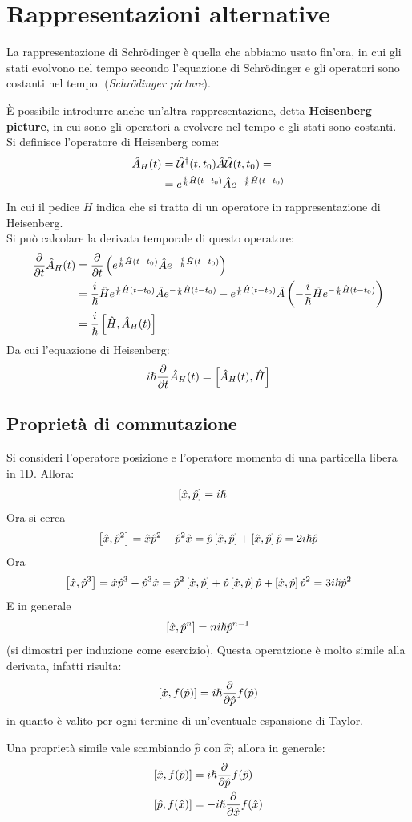 \newpage

\section{Rappresentazioni alternative}
La rappresentazione di Schrödinger è quella che abbiamo usato fin'ora, in cui gli stati evolvono nel tempo secondo l'equazione di Schrödinger e gli operatori sono costanti nel tempo. (\textit{Schrödinger picture}).

È possibile introdurre anche un'altra rappresentazione, detta \textbf{Heisenberg picture}, in cui sono gli operatori a evolvere nel tempo e gli stati sono costanti. \\
Si definisce l'operatore di Heisenberg come:
\begin{align*}
    \hat A_H(t) &= \U^\dag(t, t_0) \hat A \U(t, t_0) = \\
    &= e^{\frac{i}{\h} \hat H (t - t_0)} \hat A e^{-\frac{i}{\h} \hat H (t - t_0)}
\end{align*}
In cui il pedice $H$ indica che si tratta di un operatore in rappresentazione di Heisenberg. \\
Si può calcolare la derivata temporale di questo operatore:
\begin{align*}
    \deriv[t]{} \hat A_H(t) &= \deriv[t]{} \left( e^{\frac{i}{\h} \hat H (t - t_0)} \hat A e^{-\frac{i}{\h} \hat H (t - t_0)} \right) \\
    &= \frac{i}{\h} \hat H e^{\frac{i}{\h} \hat H (t - t_0)} \hat A e^{-\frac{i}{\h} \hat H (t - t_0)} - e^{\frac{i}{\h} \hat H (t - t_0)} \hat A \left( -\frac{i}{\h} \hat H e^{-\frac{i}{\h} \hat H (t - t_0)} \right) \\
    &= \frac{i}{\h} \comm{\hat H}{\hat A_H(t)}
\end{align*}
Da cui l'equazione di Heisenberg:
\[
    i \h \deriv[t]{} \hat A_H(t) = \comm{\hat A_H(t)}{\hat H}
\]

\subsection{Proprietà di commutazione}
Si consideri l'operatore posizione e l'operatore momento di una particella libera in 1D. Allora:
\begin{align*}
    \comm{\hat x}{\hat p} &= i \h
\end{align*}
Ora si cerca
\[
    \comm{\hat x}{\hat p^2} = \hat x \hat p^2 - \hat p^2 \hat x = \hat p \comm{\hat x}{\hat p} + \comm{\hat x}{\hat p} \hat p = 2 i \h \hat p
\]
Ora
\[
    \comm{\hat x}{\hat p^3} = \hat x \hat p^3 - \hat p^3 \hat x = \hat p^2 \comm{\hat x}{\hat p} + \hat p \comm{\hat x}{\hat p} \hat p + \comm{\hat x}{\hat p} \hat p^2 = 3 i \h \hat p^2
\]
E in generale
\[
    \comm{\hat x}{\hat p^n} = n i \h \hat p^{n-1}
\]
(si dimostri per induzione come esercizio). Questa operatzione è molto simile alla derivata, infatti risulta:
\[
    \comm{\hat x}{f(\hat p)} = i \h \deriv[\hat p]{} f(\hat p)
\]
in quanto è valito per ogni termine di un'eventuale espansione di Taylor.

Una proprietà simile vale scambiando $\hat p$ con $\hat x$; allora in generale:
\begin{align*}
    \comm{\hat x}{f(\hat p)} &= i\h \deriv[\hat p]{} f(\hat p) \\
    \comm{\hat p}{f(\hat x)} &= -i\h \deriv[\hat x]{} f(\hat x)
\end{align*}